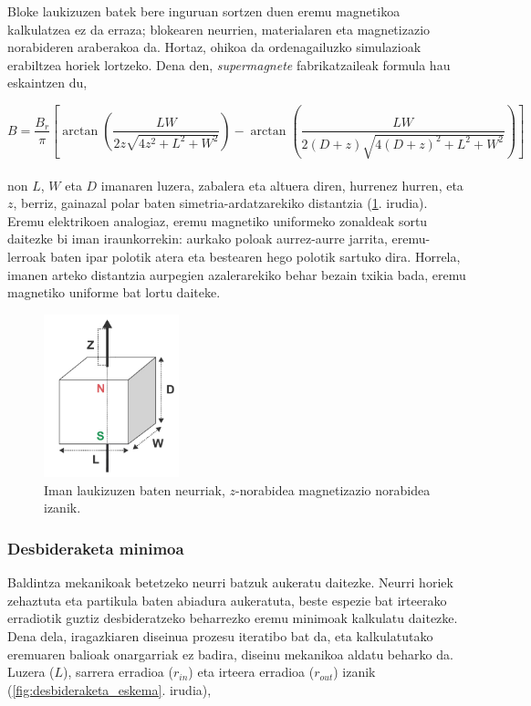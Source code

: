 \documentclass[12pt]{article}
\numberwithin{figure}{section}
\numberwithin{equation}{section}
\begin{document}
Bloke laukizuzen batek bere inguruan sortzen duen eremu magnetikoa kalkulatzea ez da erraza; blokearen neurrien, materialaren eta magnetizazio norabideren araberakoa da. Hortaz, ohikoa da ordenagailuzko simulazioak erabiltzea horiek lortzeko. Dena den, \textit{supermagnete} \cite{noauthor_calcular_nodate} fabrikatzaileak formula hau eskaintzen du,

\begin{equation}
    B = \frac{B_r}{\pi}[\arctan(\frac{LW}{2z\sqrt{4z^2+L^2+W^2}})- \arctan(\frac{LW}{2(D+z)\sqrt{4(D+z)^2+L^2+W^2}})]
\end{equation}
\\
non $L$, $W$ eta $D$ imanaren luzera, zabalera eta altuera diren, hurrenez hurren, eta $z$, berriz, gainazal polar baten simetria-ardatzarekiko distantzia (\ref{fig:bloke_magnetiko}. irudia).\\

Eremu elektrikoen analogiaz, eremu magnetiko uniformeko zonaldeak sortu daitezke bi iman iraunkorrekin: aurkako poloak aurrez-aurre jarrita, eremu-lerroak baten ipar polotik atera eta bestearen hego polotik sartuko dira. Horrela, imanen arteko distantzia aurpegien azalerarekiko behar bezain txikia bada, eremu magnetiko uniforme bat lortu daiteke.

\begin{figure}[h]
  \centering
  \includegraphics[width=0.35\textwidth]{2 - Oinarri teorikoa/magnetic_formula.png}
  \caption{Iman laukizuzen baten neurriak, $z$-norabidea magnetizazio norabidea izanik.}  \label{fig:bloke_magnetiko}
\end{figure}
\newpage
\subsubsection{Desbideraketa minimoa}
Baldintza mekanikoak betetzeko neurri batzuk aukeratu daitezke. Neurri horiek zehaztuta eta partikula baten abiadura aukeratuta, beste espezie bat irteerako erradiotik guztiz desbideratzeko beharrezko eremu minimoak kalkulatu daitezke. Dena dela, iragazkiaren diseinua prozesu iteratibo bat da, eta kalkulatutako eremuaren balioak onargarriak ez badira, diseinu mekanikoa aldatu beharko da. Luzera ($L$), sarrera erradioa ($r_{in}$) eta irteera erradioa ($r_{out}$) izanik (\ref{fig:desbideraketa_eskema}. irudia),
\end{document}
